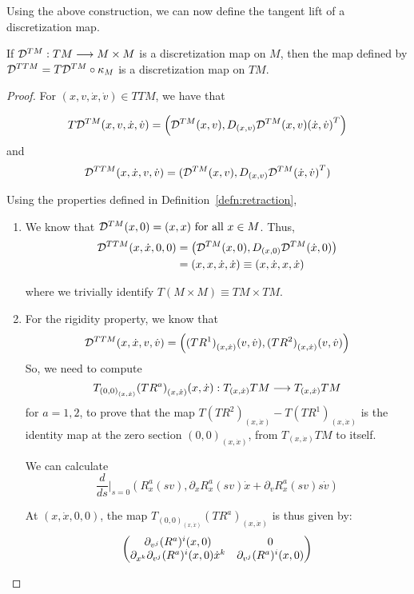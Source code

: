 Using the above construction, we can now define the tangent lift of a discretization map.

\begin{prop}
  If $\mathcal{D}^{TM} : TM \longrightarrow M \times M$ is a discretization map on $M$, then the map defined by $\mathcal{D}^{TTM} = T\mathcal{D}^{TM} \circ \kappa_M$ is a discretization map on $TM$.
\end{prop}

\begin{proof}
  For $(x,v,\dot{x}, \dot{v}) \in TTM$, we have that 
  
  \[T\mathcal{D}^{TM}(x,v,\dot{x}, \dot{v}) = \left( \mathcal{D}^{TM}(x,v), D_{(x,v)} \mathcal{D}^{TM}(x,v) {(\dot{x}, \dot{v})}^T \right)\] and
  \[
    \mathcal{D}^{TTM}(x, \dot{x}, v, \dot{v}) = (\mathcal{D}^{TM}(x,v), D_{(x,v)}\mathcal{D}^{TM}{(\dot{x}, \dot{v})}^T) 
  \]

  Using the properties defined in Definition~\eqref{defn:retraction},  
  \begin{enumerate}
      \item We know that $\D^{TM}(x, 0) = (x,x) \ \forall x \in M$. Thus,
      \begin{equation*}
      \begin{split}
          \mathcal{D}^{TTM}(x,\dot{x}, 0, 0) & = \left( \mathcal{D}^{TM}(x, 0), D_{(x,0)} \mathcal{D}^{TM}(\dot{x}, 0) \right) \\
          & = (x,x, \dot{x}, \dot{x}) \equiv (x, \dot{x}, x, \dot{x})
      \end{split}
      \end{equation*}
       
      where we trivially identify $T(M \times M) \equiv TM \times TM$.
      \item For the rigidity property, we know that
      \[\mathcal{D}^{TTM}(x, \dot{x}, v, \dot{v}) = \left({(TR^1)}_{(x,\dot{x})}(v, \dot{v}), {(TR^2)}_{(x,\dot{x})}(v, \dot{v}) \right)\]
      So, we need to compute 
      \[T_{{(0,0)}_{(x,\dot{x})}}{(TR^a)}_{(x, \dot{x})}(x, \dot{x}) : T_{(x, \dot{x})}TM \longrightarrow T_{(x, \dot{x})}TM\]
      for $a=1,2$, to prove that the map ${T(TR^2)}_{(x,\dot{x})} - T(TR^1)_{(x, \dot{x})}$ is the identity map at the zero section $(0,0)_{(x,\dot{x})}$, from $T_{(x, \dot{x})} TM$ to itself.

      We can calculate 
          \[\dfrac{d}{ds}\bigg|_{s=0} \left( R^a_x( sv), \partial_{x} R^a_x(sv) \dot{x} + \partial_v R^a_x(sv) s \dot{v} \right)\]
      
      At $(x, \dot{x}, 0, 0)$, the map $T_{(0,0)_{(x, \dot{x})}}(TR^a)_{(x, \dot{x})}$ is thus given by:
      \[\begin{pmatrix}
      \partial_{v^j}(R^a)^i(x, 0) & 0 \\
      \partial_{x^k} \partial_{v^j} (R^a)^i(x,0) \dot{x}^k & \partial_{v^j}(R^a)^i(x,0)
      \end{pmatrix}\]
      

\end{enumerate}
\end{proof}
